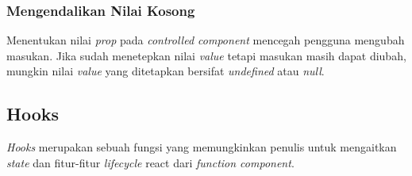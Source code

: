 \subsubsection{Mengendalikan Nilai Kosong}
Menentukan nilai \textit{prop} pada \textit{controlled component} mencegah pengguna mengubah masukan. Jika sudah menetepkan nilai \textit{value} tetapi masukan masih dapat diubah, mungkin nilai \textit{value} yang ditetapkan bersifat \textit{undefined} atau \textit{null}.





\subsection{Hooks}
\textit{Hooks} merupakan sebuah fungsi yang memungkinkan penulis untuk mengaitkan \textit{state} dan fitur-fitur \textit{lifecycle} react dari \textit{function component}.
